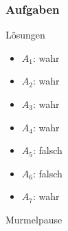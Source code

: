 \documentclass[10pt]{beamer}
\begin{document}
\subsubsection{Aufgaben}
{
\begin{frame}{Lösungen}
  \begin{itemize}[<+- | alert@+>]
        \item 
            $A_1$: wahr
        \item
            $A_2$: wahr
        \item
            $A_3$: wahr
        \item
            $A_4$: wahr 
        \item
            $A_5$: falsch
        \item
            $A_6$: falsch
        \item
            $A_7$: wahr
    \end{itemize}
\end{frame}
}

\begin{frame}[standout]
    Murmelpause
\end{frame}

\end{document}
